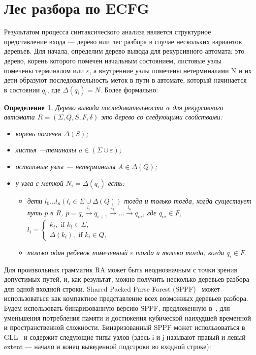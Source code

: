 \documentclass[14pt]{matmex-diploma-custom}
\newtheorem{mydef}{Определение}
\begin{document}
	\section{Лес разбора по ECFG}
	Результатом процесса синтаксического анализа является структурное представление 
	входа --- дерево или лес разбора в случае нескольких вариантов деревьев.
	Для начала, определим дерево вывода для рекурсивного автомата: 
	это дерево, корень которого помечен начальным состоянием, листовые узлы помечены
	терминалом или $\varepsilon$, а внутренние узлы помечены нетерминалами N и их
	дети образуют последовательность меток в пути в автомате, который начинается в 
	состоянии $q_i$, где $ \Delta(q_i) = N $. Более формально:
	
	\begin{mydef}
		
		Дерево вывода последовательности $\alpha$ для рекурсивного автомата $R=(\Sigma, Q, S, F, \delta)$ это дерево со следующими свойствами:
		
		\begin{itemize}
			\item корень помечен $\Delta(S)$;
			\item листья ---теминалы $a\in (\Sigma \cup \varepsilon)$;
			\item остальные узлы --- нетерминалы $A\in \Delta(Q)$;
			\item у узла с меткой $N_i = \Delta(q_i)$ есть:
			\begin{itemize}
				\item 
				дети $l_0 \dots l_n (l_i \in \Sigma \cup \Delta(Q))$ тогда и только тогда,
				когда существует путь $p$ в $R$, $p = q_i \xrightarrow[]{l_0} q_{i+1} \xrightarrow[]{l_1} \dots \xrightarrow{l_n} q_m$, где
				$q_m \in F$, $l_i = 
				\left\{
				\begin{matrix}
				k_i, \text{ if }  k_i \in \Sigma,\\
				\Delta(k_i), \text{ if } k_i \in Q,
				\end{matrix}
				\right.
				$
				\item только один ребенок помеченный $\varepsilon$ тогда и только тогда,
				когда $ q_i \in F $.
			\end{itemize}
		\end{itemize}
	\end{mydef}
	Для произвольных грамматик RA может быть неоднозначным с точки зрения допустимых путей,
	и, как результат, можно получить несколько деревьев разбора для одной входной строки.
	Shared Packed Parse Forest (SPPF)~\cite{SPPF} может использоваться как компактное
	представление всех возможных деревьев разбора. Будем использовать бинаризованную версию SPPF,
	предложенную в~\cite{brnglr}, для уменьшения потребления памяти и достижения кубической
	наихудшей временной и пространственной сложности. Бинаризованный SPPF может использоваться
	в GLL~\cite{scott2013gll} и содержит следующие типы узлов (здесь i и j называют правый и
	левый extent --- начало и конец выведенной подстроки во входной строке):
	
\end{document}
